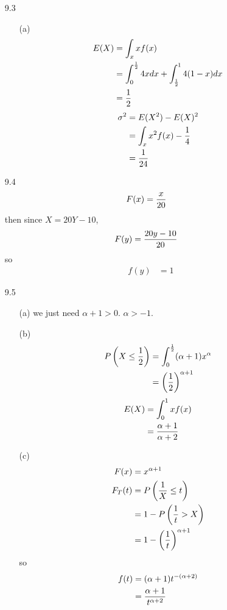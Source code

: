 \documentclass[english, 11pt]{article}
\begin{document}
\begin{itemize}
    \item[9.3]
    \begin{itemize}
      \item[(a)]
      \begin{align*}
        E(X) & = \int_x xf(x) \\
        & = \int_0^{\frac{1}{2}} 4x dx + \int_{\frac{1}{2}}^1 4(1-x) dx \\
        & = \frac{1}{2}
      \end{align*}
      \begin{align*}
        \sigma^2 & = E(X^2) - E(X)^2 \\
          & = \int_x x^2f(x) - \frac{1}{4} \\
          & = \frac{1}{24}
      \end{align*}
    \end{itemize}

    \item[9.4]
    \begin{align*}
      F(x) & = \frac{x}{20}
    \end{align*}
    then since $X = 20Y - 10$,
    \begin{align*}
      F(y) & = \frac{20y - 10}{20}
    \end{align*}
    so
    \begin{align*}
      f(y) & = 1
    \end{align*}

    \item[9.5]
    \begin{itemize}
      \item[(a)]
      we just need $\alpha + 1 > 0$. $\alpha > -1$.
      \item[(b)]
      \begin{align*}
        P \left( X \leq \frac{1}{2} \right) & = \int_0^{\frac{1}{2}} (\alpha + 1)x^{\alpha} \\
        & = \left( \frac{1}{2} \right)^{\alpha + 1}
      \end{align*}
      \begin{align*}
        E(X) & = \int_0^1 xf(x) \\
             & = \frac{\alpha +1}{\alpha + 2}
      \end{align*}
      \item[(c)]
      \begin{align*}
        F(x) & = x^{\alpha + 1} \\
        F_T(t) & = P \left( \frac{1}{X} \leq t \right) \\
        & = 1 - P \left( \frac{1}{t} > X \right) \\
        & = 1 - \left( \frac{1}{t} \right)^{\alpha + 1}
              \end{align*}
              so
              \begin{align*}
                f(t) & = (\alpha + 1) t^{-(\alpha + 2)} \\
                & = \frac{\alpha + 1}{t^{\alpha + 2}}
              \end{align*}
    \end{itemize}




\end{itemize}
\end{document}
